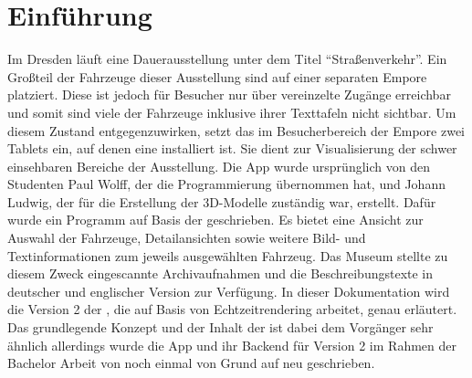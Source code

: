 \chapter{Einführung}
\label{chap:intro}
Im \vmd{} Dresden läuft eine Dauerausstellung unter dem Titel \enquote{Straßenverkehr}. Ein Großteil der Fahrzeuge dieser Ausstellung sind auf einer separaten Empore platziert. Diese ist jedoch für Besucher nur über vereinzelte Zugänge erreichbar und somit sind viele der Fahrzeuge inklusive ihrer Texttafeln nicht sichtbar. Um diesem Zustand entgegenzuwirken, setzt das \vmd{} im Besucherbereich der Empore zwei Tablets ein, auf denen eine \mapp{} installiert ist. Sie dient zur Visualisierung der schwer einsehbaren Bereiche der Ausstellung. Die App wurde ursprünglich von den Studenten Paul Wolff, der die Programmierung übernommen hat, und Johann Ludwig, der für die Erstellung der 3D-Modelle zuständig war, erstellt. Dafür wurde ein Programm auf Basis der \unite{} geschrieben. Es bietet eine Ansicht zur Auswahl der Fahrzeuge, Detailansichten sowie weitere Bild- und Textinformationen zum jeweils ausgewählten Fahrzeug. Das Museum stellte zu diesem Zweck eingescannte Archivaufnahmen und die Beschreibungstexte in deutscher und englischer Version zur Verfügung. In dieser Dokumentation wird die Version 2 der \mapp, die auf Basis von Echtzeitrendering arbeitet, genau erläutert. Das grundlegende Konzept und der Inhalt der \mapp ist dabei dem Vorgänger sehr ähnlich allerdings wurde die App und ihr Backend für Version 2 im Rahmen der Bachelor Arbeit von \writer{} noch einmal von Grund auf neu geschrieben.
%
